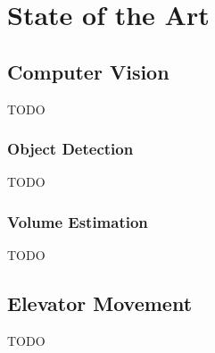 \chapter{State of the Art}
\label{chap:sota}

\section{Computer Vision}

TODO

\subsection{Object Detection}

TODO

\subsection{Volume Estimation}

TODO

\section{Elevator Movement}


TODO
